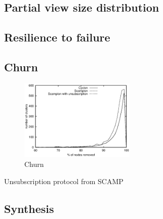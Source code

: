 \subsection{Partial view size distribution}

\subsection{Resilience to failure}

\subsection{Churn}

\label{subsec:churn}

\begin{figure}
    \centering
    \includegraphics[width=0.49\textwidth]{img/churn.eps}
    \caption{Churn}
    \label{fig:churn}
\end{figure}

\begin{algorithm}

\caption{\label{algo:unsubscription}Unsubscription protocol from
  SCAMP~\cite{ganesh2003peer}}
\end{algorithm}

\subsection{Synthesis}

